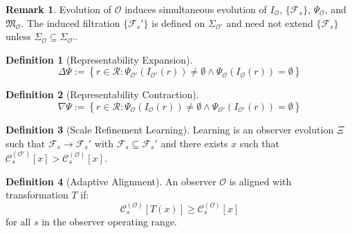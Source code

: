 \documentclass[12pt]{article}
\theoremstyle{definition}
\newtheorem{definition}{Definition}
\newtheorem{remark}{Remark}
\begin{document}
\begin{remark}
Evolution of $\mathcal{O}$ induces simultaneous evolution of $I_{\mathcal{O}}$, $\{\mathcal{F}_s\}$, $\Psi_{\mathcal{O}}$, and $\mathfrak{M}_{\mathcal{O}}$. The induced filtration $\{\mathcal{F}_{s}'\}$ is defined on $\Sigma_{\mathcal{O}'}$ and need not extend $\{\mathcal{F}_s\}$ unless $\Sigma_{\mathcal{O}} \subseteq \Sigma_{\mathcal{O}'}$.
\end{remark}

\begin{definition}[Representability Expansion]
\begin{equation}
\Delta\Psi := \left\{ r \in \mathcal{R} : \Psi_{\mathcal{O}'}(I_{\mathcal{O}'}(r)) \neq \emptyset \land \Psi_{\mathcal{O}}(I_{\mathcal{O}}(r)) = \emptyset \right\}
\end{equation}
\end{definition}

\begin{definition}[Representability Contraction]
\begin{equation}
\nabla\Psi := \left\{ r \in \mathcal{R} : \Psi_{\mathcal{O}}(I_{\mathcal{O}}(r)) \neq \emptyset \land \Psi_{\mathcal{O}'}(I_{\mathcal{O}'}(r)) = \emptyset \right\}
\end{equation}
\end{definition}

\begin{definition}[Scale Refinement Learning]
Learning is an observer evolution $\Xi$ such that $\mathcal{F}_s \to \mathcal{F}_s'$ with $\mathcal{F}_s \subseteq \mathcal{F}_s'$ and there exists $x$ such that $\mathcal{C}_s^{(\mathcal{O}')}[x] > \mathcal{C}_s^{(\mathcal{O})}[x]$.
\end{definition}

\begin{definition}[Adaptive Alignment]
An observer $\mathcal{O}$ is aligned with transformation $T$ if:
\begin{equation}
\mathcal{C}_s^{(\mathcal{O})}[T(x)] \geq \mathcal{C}_s^{(\mathcal{O})}[x]
\end{equation}
for all $s$ in the observer operating range.
\end{definition}
\end{document}
